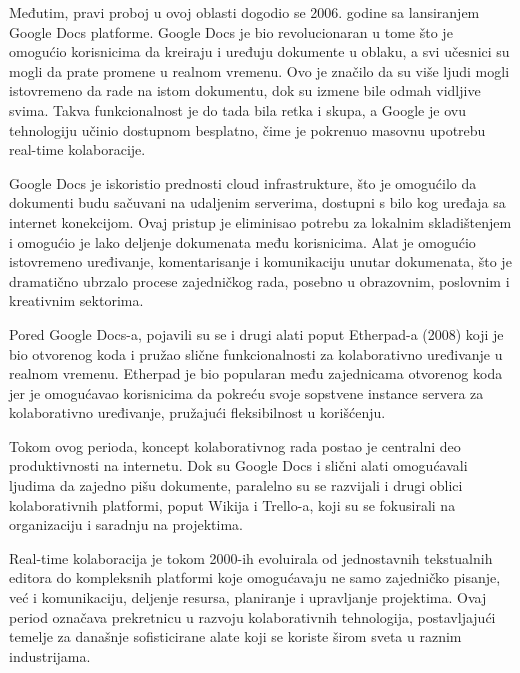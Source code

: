 \documentclass[12pt]{article}
\begin{document}
    Međutim, pravi proboj u ovoj oblasti dogodio se 2006. godine sa lansiranjem Google Docs platforme. Google Docs je bio revolucionaran u tome što je omogućio korisnicima da kreiraju i uređuju dokumente u oblaku, a svi učesnici su mogli da prate promene u realnom vremenu. Ovo je značilo da su više ljudi mogli istovremeno da rade na istom dokumentu, dok su izmene bile odmah vidljive svima. Takva funkcionalnost je do tada bila retka i skupa, a Google je ovu tehnologiju učinio dostupnom besplatno, čime je pokrenuo masovnu upotrebu real-time kolaboracije.
    
    Google Docs je iskoristio prednosti cloud infrastrukture, što je omogućilo da dokumenti budu sačuvani na udaljenim serverima, dostupni s bilo kog uređaja sa internet konekcijom. Ovaj pristup je eliminisao potrebu za lokalnim skladištenjem i omogućio je lako deljenje dokumenata među korisnicima. Alat je omogućio istovremeno uređivanje, komentarisanje i komunikaciju unutar dokumenata, što je dramatično ubrzalo procese zajedničkog rada, posebno u obrazovnim, poslovnim i kreativnim sektorima.
    
    Pored Google Docs-a, pojavili su se i drugi alati poput Etherpad-a (2008) koji je bio otvorenog koda i pružao slične funkcionalnosti za kolaborativno uređivanje u realnom vremenu. Etherpad je bio popularan među zajednicama otvorenog koda jer je omogućavao korisnicima da pokreću svoje sopstvene instance servera za kolaborativno uređivanje, pružajući fleksibilnost u korišćenju.
    
    Tokom ovog perioda, koncept kolaborativnog rada postao je centralni deo produktivnosti na internetu. Dok su Google Docs i slični alati omogućavali ljudima da zajedno pišu dokumente, paralelno su se razvijali i drugi oblici kolaborativnih platformi, poput Wikija i Trello-a, koji su se fokusirali na organizaciju i saradnju na projektima.
    
    Real-time kolaboracija je tokom 2000-ih evoluirala od jednostavnih tekstualnih editora do kompleksnih platformi koje omogućavaju ne samo zajedničko pisanje, već i komunikaciju, deljenje resursa, planiranje i upravljanje projektima. Ovaj period označava prekretnicu u razvoju kolaborativnih tehnologija, postavljajući temelje za današnje sofisticirane alate koji se koriste širom sveta u raznim industrijama.
    
    
\end{document}
